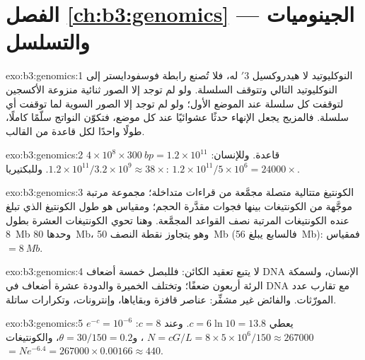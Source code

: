 \section*{الفصل \ref{ch:b3:genomics} --- الجينوميات والتسلسل}

\begin{solution}{exo:b3:genomics:1}
النوكليوتيد  لا هيدروكسيل 3$'$ له، فلا تُصنع
رابطة فوسفودايستر إلى النوكليوتيد التالي وتتوقف السلسلة. ولو لم
توجد إلا الصور ثنائية منزوعة الأكسجين لتوقفت كل سلسلة عند الموضع
الأول؛ ولو لم توجد إلا الصور السوية لما توقفت أي سلسلة. فالمزيج
يجعل الإنهاء حدثًا عشوائيًا عند كل موضع، فتكوّن النواتج سلّمًا كاملًا،
طولًا واحدًا لكل قاعدة من القالب.
\end{solution}

\begin{solution}{exo:b3:genomics:2}
$4\times 10^{8}\times \qty{300}{bp} = 1.2\times 10^{11}$ قاعدة. وللإنسان:
$1.2\times 10^{11}/3.2\times 10^{9} \approx 38\times$. وللبكتيريا:
$1.2\times 10^{11}/5\times 10^{6} = \num{24000}\times$.
\end{solution}

\begin{solution}{exo:b3:genomics:3}
الكونتيغ متتالية متصلة مجمَّعة من قراءات متداخلة؛  مجموعة
مرتبة موجَّهة من الكونتيغات بينها فجوات مقدَّرة
الحجم؛ ومقياس  هو طول الكونتيغ الذي تبلغ عنده الكونتيغات المرتبة
نصف القواعد المجمَّعة. وهنا تحوي الكونتيغات العشرة بطول \qty{8}{Mb}
وحدها \qty{80}{Mb}، وهو يتجاوز نقطة النصف \qty{50}{Mb}
(فالسابع يبلغ \qty{56}{Mb}): فمقياس  $= \qty{8}{Mb}$.
\end{solution}

\begin{solution}{exo:b3:genomics:4}
 لا يتبع تعقيد الكائن: فللبصل خمسة
أضعاف DNA الإنسان، ولسمكة الرئة أربعون ضعفًا؛ وتختلف الخميرة والدودة
عشرة أضعاف في DNA مع تقارب عدد المورّثات. والفائض
غير مشفِّر: عناصر قافزة وبقاياها، وإنترونات،
وتكرارات ساتلة.
\end{solution}

\begin{solution}{exo:b3:genomics:5}
$e^{-c} = 10^{-6}$ يعطي $c = 6\ln 10 = 13.8$. وعند $c = 8$: $N =
cG/L = 8\times 5\times 10^{6}/150 \approx \num{267000}$ ، و$\theta
= 30/150 = 0.2$، والكونتيغات $= N e^{-6.4} = \num{267000}\times 0.00166
\approx 440$.
\end{solution}


